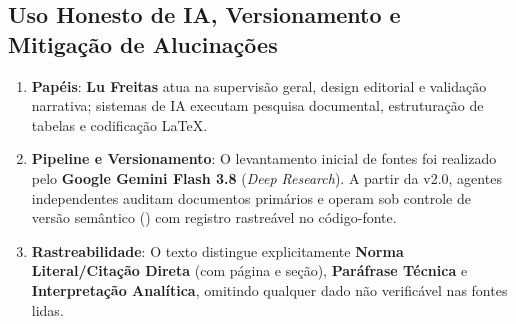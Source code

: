 \documentclass[11pt,a4paper]{article}
\begin{document}
\subsection*{Uso Honesto de IA, Versionamento e Mitigação de Alucinações}
\begin{enumerate}
    \item \textbf{Papéis}: \textbf{Lu Freitas} atua na supervisão geral, design editorial e validação narrativa; sistemas de IA executam pesquisa documental, estruturação de tabelas e codificação \LaTeX{}.
    \item \textbf{Pipeline e Versionamento}: O levantamento inicial de fontes foi realizado pelo \textbf{Google Gemini Flash 3.8} (\textit{Deep Research}). A partir da v2.0, agentes independentes auditam documentos primários e operam sob controle de versão semântico (\texttt{\docversion}) com registro rastreável no código-fonte.
    \item \textbf{Rastreabilidade}: O texto distingue explicitamente \textbf{Norma Literal/Citação Direta} (com página e seção), \textbf{Paráfrase Técnica} e \textbf{Interpretação Analítica}, omitindo qualquer dado não verificável nas fontes lidas.
\end{enumerate}

\clearpage


\clearpage


\clearpage


\clearpage


\appendix
\clearpage


\clearpage


\clearpage


\clearpage

\end{document}
